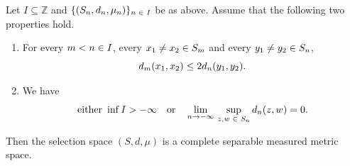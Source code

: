 \documentclass[10pt]{amsart}
\theoremstyle{definition}\newtheorem{defi}[theo]{Definition}\newtheorem{rema}[theo]{Remark}\newtheorem{exam}[theo]{Example}\newtheorem{exem}[theo]{Example}\newtheorem{nota}[theo]{Notation}
\newcommand*\z{\mathbb{Z}}
\let\originalleft\left
\let\originalright\right
\renewcommand{\left}{\mathopen{}\mathclose\bgroup\originalleft}
\renewcommand{\right}{\aftergroup\egroup\originalright}
\renewcommand*{\to}{\mathchoice{\longrightarrow}{\rightarrow}{\rightarrow}{\rightarrow}}
\let\oldin\in
\renewcommand{\in}{\mathchoice{\oldin}{\oldin}{\,\oldin\,}{\,\oldin\,}}
\begin{document}
\begin{prop}\label{prop:selection_space_properties}
Let $I\subseteq\z$ and $\{ (S_{n},d_{n},\mu_{n})\} _{n\in I}$ be as above. Assume that the following two properties hold.
\begin{enumerate}
\item\label{prop2.2.1} For every $m<n\in I$, every $x_{1}\neq x_{2}\in S_{m}$ and every $y_{1}\neq y_{2}\in S_{n}$,
\begin{equation}\label{eq:metrics_are_subadditive_assumption}
d_{m}\left(x_{1},x_{2}\right)\leq2d_{n}\left(y_{1},y_{2}\right).
\end{equation}
\item\label{prop2.2.2} We have
\begin{equation}\label{eq:assumption_separability}
\text{either }
\inf I>-\infty\quad
\text{or}\quad
\lim_{n\to-\infty}\,\sup_{z,w\in S_{n}}d_{n}\left(z,w\right)=0.
\end{equation}
\end{enumerate}
Then the selection space $(S,d,\mu)$ is a complete separable measured metric space.
\end{prop}
\end{document}
